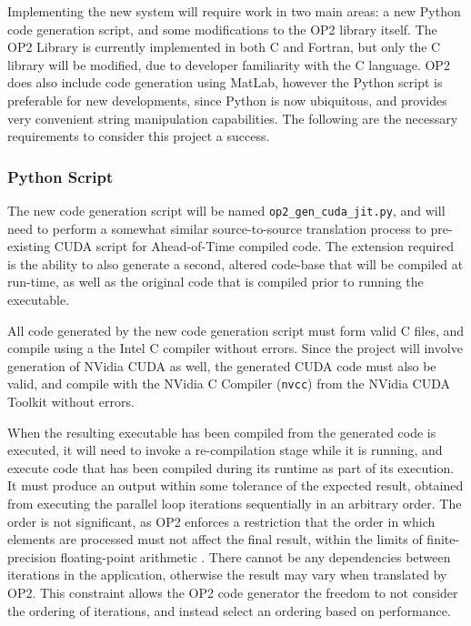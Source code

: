 Implementing the new system will require work in two main areas: a new Python code generation script, and some modifications to the OP2 library itself. The OP2 Library is currently implemented in both C and Fortran, but only the C library will be modified, due to developer familiarity with the C language. OP2 does also include code generation using MatLab, however the Python script is preferable for new developments, since Python is now ubiquitous, and provides very convenient string manipulation capabilities. The following are the necessary requirements to consider this project a success.

\subsubsection{Python Script}
The new code generation script will be named \verb|op2_gen_cuda_jit.py|, and will need to perform a somewhat similar source-to-source translation process to pre-existing CUDA script for Ahead-of-Time compiled code. The extension required is the ability to also generate a second, altered code-base that will be compiled at run-time, as well as the original code that is compiled prior to running the executable.
\par
All code generated by the new code generation script must form valid C files, and compile using a the Intel C compiler \cite{icc} without errors. Since the project will involve generation of NVidia CUDA as well, the generated CUDA code must also be valid, and compile with the NVidia C Compiler (\verb|nvcc|) from the NVidia CUDA Toolkit \cite{nvcc,toolkit} without errors.
\par
When the resulting executable has been compiled from the generated code is executed, it will need to invoke a re-compilation stage while it is running, and execute code that has been compiled during its runtime as part of its execution. It must produce an output within some tolerance of the expected result, obtained from executing the parallel loop iterations sequentially in an arbitrary order. The order is not significant, as OP2 enforces a restriction that the order in which elements are processed must not affect the final result, within the limits of finite-precision floating-point arithmetic \cite[p3]{op2main}. There cannot be any dependencies between iterations in the application, otherwise the result may vary when translated by OP2. This constraint allows the OP2 code generator the freedom to not consider the ordering of iterations, and instead select an ordering based on performance.

